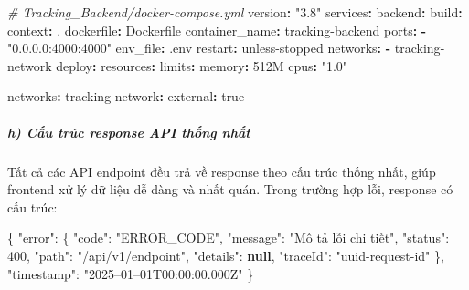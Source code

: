 \documentclass[13pt,a4paper]{extarticle}
\newenvironment{Shaded}{}{}
\newcommand{\AttributeTok}[1]{\textcolor[rgb]{0.49,0.56,0.16}{#1}}
\newcommand{\CharTok}[1]{\textcolor[rgb]{0.25,0.44,0.63}{#1}}
\newcommand{\CommentTok}[1]{\textcolor[rgb]{0.38,0.63,0.69}{\textit{#1}}}
\newcommand{\DataTypeTok}[1]{\textcolor[rgb]{0.56,0.13,0.00}{#1}}
\newcommand{\DecValTok}[1]{\textcolor[rgb]{0.25,0.63,0.44}{#1}}
\newcommand{\FunctionTok}[1]{\textcolor[rgb]{0.02,0.16,0.49}{#1}}
\newcommand{\KeywordTok}[1]{\textcolor[rgb]{0.00,0.44,0.13}{\textbf{#1}}}
\newcommand{\StringTok}[1]{\textcolor[rgb]{0.25,0.44,0.63}{#1}}
\renewcommand{\\}{\thesislongtableorignewline\hline}%
\begin{document}
\begin{Shaded}
\begin{Highlighting}[]
\CommentTok{\# Tracking\_Backend/docker{-}compose.yml}
\FunctionTok{version}\KeywordTok{:}\AttributeTok{ }\StringTok{"3.8"}
\FunctionTok{services}\KeywordTok{:}
\AttributeTok{  }\FunctionTok{backend}\KeywordTok{:}
\AttributeTok{    }\FunctionTok{build}\KeywordTok{:}
\AttributeTok{      }\FunctionTok{context}\KeywordTok{:}\AttributeTok{ .}
\AttributeTok{      }\FunctionTok{dockerfile}\KeywordTok{:}\AttributeTok{ Dockerfile}
\AttributeTok{    }\FunctionTok{container\_name}\KeywordTok{:}\AttributeTok{ tracking{-}backend}
\AttributeTok{    }\FunctionTok{ports}\KeywordTok{:}
\AttributeTok{      }\KeywordTok{{-}}\AttributeTok{ }\StringTok{"0.0.0.0:4000:4000"}
\AttributeTok{    }\FunctionTok{env\_file}\KeywordTok{:}\AttributeTok{ .env}
\AttributeTok{    }\FunctionTok{restart}\KeywordTok{:}\AttributeTok{ unless{-}stopped}
\AttributeTok{    }\FunctionTok{networks}\KeywordTok{:}
\AttributeTok{      }\KeywordTok{{-}}\AttributeTok{ tracking{-}network}
\AttributeTok{    }\FunctionTok{deploy}\KeywordTok{:}
\AttributeTok{      }\FunctionTok{resources}\KeywordTok{:}
\AttributeTok{        }\FunctionTok{limits}\KeywordTok{:}
\AttributeTok{          }\FunctionTok{memory}\KeywordTok{:}\AttributeTok{ 512M}
\AttributeTok{          }\FunctionTok{cpus}\KeywordTok{:}\AttributeTok{ }\StringTok{"1.0"}

\FunctionTok{networks}\KeywordTok{:}
\AttributeTok{  }\FunctionTok{tracking{-}network}\KeywordTok{:}
\AttributeTok{    }\FunctionTok{external}\KeywordTok{:}\AttributeTok{ }\CharTok{true}
\end{Highlighting}
\end{Shaded}

\subparagraph{h) Cấu trúc response API thống
nhất}\label{h-cux1ea5u-truxfac-response-api-thux1ed1ng-nhux1ea5t}

Tất cả các API endpoint đều trả về response theo cấu trúc thống nhất,
giúp frontend xử lý dữ liệu dễ dàng và nhất quán. Trong trường hợp lỗi,
response có cấu trúc:

\begin{Shaded}
\begin{Highlighting}[]
\FunctionTok{\{}
  \DataTypeTok{"error"}\FunctionTok{:} \FunctionTok{\{}
    \DataTypeTok{"code"}\FunctionTok{:} \StringTok{"ERROR\_CODE"}\FunctionTok{,}
    \DataTypeTok{"message"}\FunctionTok{:} \StringTok{"Mô tả lỗi chi tiết"}\FunctionTok{,}
    \DataTypeTok{"status"}\FunctionTok{:} \DecValTok{400}\FunctionTok{,}
    \DataTypeTok{"path"}\FunctionTok{:} \StringTok{"/api/v1/endpoint"}\FunctionTok{,}
    \DataTypeTok{"details"}\FunctionTok{:} \KeywordTok{null}\FunctionTok{,}
    \DataTypeTok{"traceId"}\FunctionTok{:} \StringTok{"uuid{-}request{-}id"}
  \FunctionTok{\},}
  \DataTypeTok{"timestamp"}\FunctionTok{:} \StringTok{"2025–01–01T00:00:00.000Z"}
\FunctionTok{\}}
\end{Highlighting}
\end{Shaded}
\end{document}
